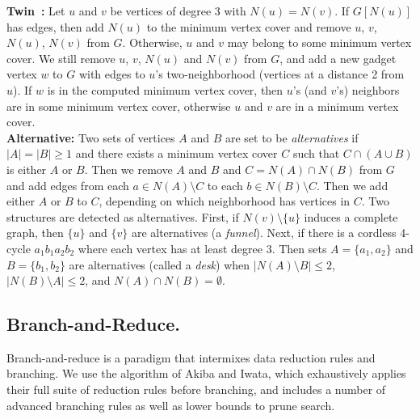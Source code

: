 \documentclass[twoside,leqno,twocolumn]{article}
\begin{document}
\noindent\textbf{Twin~\cite{Xiao201392}:} Let $u$ and $v$ be vertices of degree 3 with $N(u) = N(v)$. If $G[N(u)]$ has edges, then add $N(u)$ to the minimum vertex cover and remove $u$, $v$, $N(u)$, $N(v)$ from $G$. Otherwise, $u$ and $v$ may belong to some minimum vertex cover. We still remove $u$, $v$, $N(u)$ and $N(v)$ from $G$, and add a new gadget vertex $w$ to $G$ with edges to $u$'s two-neighborhood (vertices at a distance 2 from $u$). If $w$ is in the computed minimum vertex cover, then $u$'s (and $v$'s) neighbors are in some minimum vertex cover, otherwise $u$ and $v$ are in a minimum vertex cover.\\

\noindent\textbf{Alternative:} Two sets of vertices $A$ and $B$ are set to be \emph{alternatives} if $|A| = |B| \geq 1$ and there exists a minimum vertex cover $C$ such that $C\cap(A\cup B)$ is either $A$ or $B$. Then we remove $A$ and $B$ and $C = N(A)\cap N(B)$ from $G$ and add edges from each $a \in N(A)\setminus C$ to each $b\in N(B)\setminus C$.
Then we add either $A$ or $B$ to $C$, depending on which neighborhood has vertices in $C$. Two structures are detected as alternatives. First, if $N(v)\setminus \{u\}$ induces a complete graph, then $\{u\}$ and $\{v\}$ are alternatives (a \emph{funnel}). Next, if there is a cordless 4-cycle $a_1b_1a_2b_2$ where each vertex has at least degree 3. Then sets $A=\{a_1, a_2\}$ and $B=\{b_1, b_2\}$ are alternatives (called a \emph{desk}) when $|N(A) \setminus B| \leq 2$, $|N(B) \setminus A| \leq 2$, and $N(A) \cap N(B) = \emptyset$. 

\subsection{Branch-and-Reduce.}
Branch-and-reduce is a paradigm that intermixes data reduction rules and branching. We use the algorithm of Akiba and Iwata, which exhaustively applies their full suite of reduction rules before branching, and includes a number of advanced branching rules as well as lower bounds to prune search. 
\end{document}
